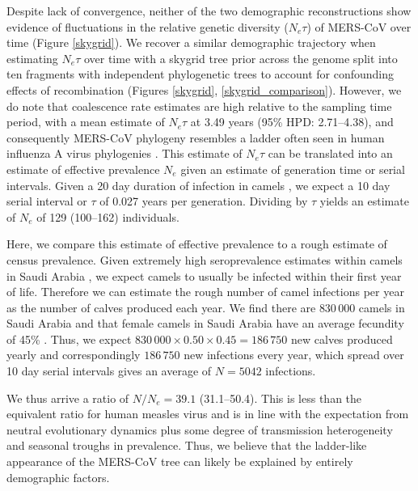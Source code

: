 \documentclass[11pt,oneside,letterpaper]{article}
\begin{document}
Despite lack of convergence, neither of the two demographic reconstructions show evidence of fluctuations in the relative genetic diversity ($N_e \tau$) of  MERS-CoV over time (Figure \ref{skygrid}).
We recover a similar demographic trajectory when estimating $N_{e}\tau$ over time with a skygrid tree prior across the genome split into ten fragments with independent phylogenetic trees to account for confounding effects of recombination (Figures \ref{skygrid}, \ref{skygrid_comparison}).
However, we do note that coalescence rate estimates are high relative to the sampling time period, with a mean estimate of $N_e\tau$ at 3.49 years (95\% HPD: 2.71--4.38), and consequently MERS-CoV phylogeny resembles a ladder often seen in human influenza A virus phylogenies \citep{bedford_strength_2011}.
This estimate of $N_e\tau$ can be translated into an estimate of effective prevalence $N_e$ given an estimate of generation time or serial intervals.
Given a 20 day duration of infection in camels \citep{adney_replication_2014}, we expect a 10 day serial interval or $\tau$ of 0.027 years per generation.
Dividing by $\tau$ yields an estimate of $N_e$ of 129 (100--162) individuals.

Here, we compare this estimate of effective prevalence to a rough estimate of census prevalence.
Given extremely high seroprevalence estimates within camels in Saudi Arabia \citep{muller_2014,corman_antibodies_2014,chu_2014,reusken_2013,reusken_2014}, we expect camels to usually be infected within their first year of life.
Therefore we can estimate the rough number of camel infections per year as the number of calves produced each year.
We find there are $830\,000$ camels in Saudi Arabia \citep{abdallah_camel_farming_2013} and that female camels in Saudi Arabia have an average fecundity of 45\% \citep{abdallah_camel_farming_2013}.
Thus, we expect $830\,000 \times 0.50 \times 0.45 = 186\,750$ new calves produced yearly and correspondingly $186\,750$ new infections every year, which spread over 10 day serial intervals gives an average of $N = 5042$ infections.

We thus arrive a ratio of $N/N_e = 39.1$ (31.1--50.4).
This is less than the equivalent ratio for human measles virus \citep{bedford_strength_2011} and is in line with the expectation from neutral evolutionary dynamics plus some degree of transmission heterogeneity \citep{volz_phylodynamics_2013} and seasonal troughs in prevalence.
Thus, we believe that the ladder-like appearance of the MERS-CoV tree can likely be explained by entirely demographic factors.
\end{document}
